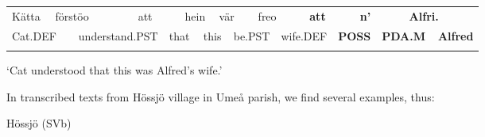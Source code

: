 \begin{tabular}{llllllllllllllllll}
\lsptoprule
Kätta & \multicolumn{2}{l}{förstöo

} & \multicolumn{2}{l}{att

} & \multicolumn{2}{l}{hein

} & \multicolumn{2}{l}{vär

} & \multicolumn{2}{l}{freo

} & \multicolumn{2}{l}{{\bfseries att}

} & \multicolumn{2}{l}{{\bfseries n’}

} & \multicolumn{2}{l}{{\bfseries Alfri.}

} & \\
\multicolumn{2}{l}{Cat.DEF

} & \multicolumn{2}{l}{understand.PST

} & \multicolumn{2}{l}{that

} & \multicolumn{2}{l}{this

} & \multicolumn{2}{l}{be.PST

} & \multicolumn{2}{l}{wife.DEF

} & \multicolumn{2}{l}{{\bfseries POSS}

} & \multicolumn{2}{l}{{\bfseries PDA.M}

} & \multicolumn{2}{l}{{\bfseries Alfred}

}\\
\lspbottomrule
\end{tabular}

\begin{styleTranslation}
‘Cat understood that this was Alfred’s wife.’

\end{styleTranslation}

\begin{styleBodyTextFirst}
In transcribed texts from Hössjö village in Umeå parish, we find several examples, thus:

\end{styleBodyTextFirst}

\begin{listWWNumileveli}
\item {}

\begin{styleExample}
Hössjö (SVb)

\end{styleExample}

\end{listWWNumileveli}

